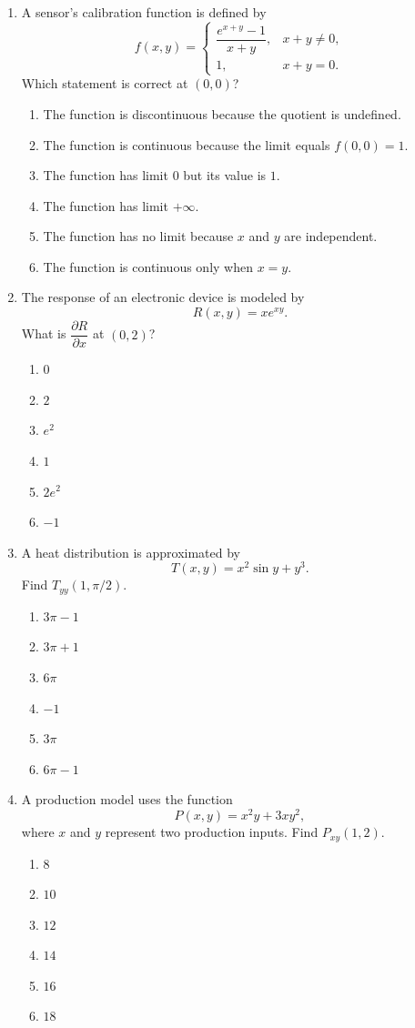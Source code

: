 \documentclass[a4paper,12pt]{article}
\theoremstyle{mystyle}
\numberwithin{equation}{section}
\numberwithin{theorem}{section}
\numberwithin{proposition}{section}
\numberwithin{example}{section}
\numberwithin{remark}{section}
\numberwithin{lemma}{section}
\numberwithin{corollary}{section}
\numberwithin{definition}{section}
\begin{document}
\begin{enumerate}
\item A sensor's calibration function is defined by
\[
    f(x,y)=
    \begin{cases}
    \dfrac{e^{x+y}-1}{x+y}, & x+y\neq0,\\[6pt]
    1, & x+y=0.
    \end{cases}
\]
Which statement is correct at $(0,0)$?
\begin{enumerate}
    \item The function is discontinuous because the quotient is undefined.
    \item The function is continuous because the limit equals $f(0,0)=1$.
    \item The function has limit $0$ but its value is $1$.
    \item The function has limit $+\infty$.
    \item The function has no limit because $x$ and $y$ are independent.
    \item The function is continuous only when $x=y$.
\end{enumerate}

\item The response of an electronic device is modeled by
\[
    R(x,y)=xe^{xy}.
\]
What is $\dfrac{\partial R}{\partial x}$ at $(0,2)$?
\begin{enumerate}
    \item $0$
    \item $2$
    \item $e^2$
    \item $1$
    \item $2e^2$
    \item $-1$
\end{enumerate}

\item A heat distribution is approximated by
\[
    T(x,y)=x^2\sin y+y^3.
\]
Find $T_{yy}(1,\pi/2)$.
\begin{enumerate}
    \item $3\pi-1$
    \item $3\pi+1$
    \item $6\pi$
    \item $-1$
    \item $3\pi$
    \item $6\pi-1$
\end{enumerate}

\item A production model uses the function
\[
    P(x,y)=x^2y+3xy^2,
\]
where $x$ and $y$ represent two production inputs. Find
$P_{xy}(1,2)$.
\begin{enumerate}
    \item $8$
    \item $10$
    \item $12$
    \item $14$
    \item $16$
    \item $18$
\end{enumerate}


\end{enumerate}
\end{document}
